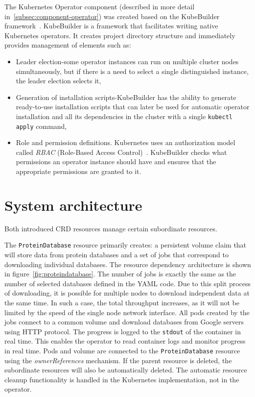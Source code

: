 The Kubernetes Operator component (described in more detail in~\ref{subsec:component-operator}) was created based on the KubeBuilder framework~\cite{kubebuilder}.
KubeBuilder is a framework that facilitates writing native Kubernetes operators.
It creates project directory structure and immediately provides management of elements such as:
\begin{itemize}
    \item Leader election-some operator instances can run on multiple cluster nodes simultaneously, but if there is a need to select a single distinguished instance, the leader election selects it,
    \item Generation of installation scripts-KubeBuilder has the ability to generate ready-to-use installation scripts that can later be used for automatic operator installation and all its dependencies in the cluster with a single \texttt{kubectl apply} command,
    \item Role and permission definitions.
    Kubernetes uses an authorization model called \textit{RBAC} (Role-Based Access Control)~\cite{k8s_rbac}.
    KubeBuilder checks what permissions an operator instance should have and ensures that the appropriate permissions are granted to it.
\end{itemize}


\section{System architecture}

Both introduced CRD resources manage certain subordinate resources.

The \texttt{ProteinDatabase} resource primarily creates: a persistent volume claim that will store data from protein databases and a set of jobs that correspond to downloading individual databases.
The resource dependency architecture is shown in figure~\ref{fig:proteindatabase}.
The number of jobs is exactly the same as the number of selected databases defined in the YAML code.
Due to this split process of downloading, it is possible for multiple nodes to download independent data at the same time.
In such a case, the total throughput increases, as it will not be limited by the speed of the single node network interface.
All pods created by the jobs connect to a common volume and download databases from Google servers using HTTP protocol.
The progress is logged to the \texttt{stdout} of the container in real time.
This enables the operator to read container logs and monitor progress in real time.
Pods and volume are connected to the \texttt{ProteinDatabase} resource using the \textit{ownerReferences} mechanism.
If the parent resource is deleted, the subordinate resources will also be automatically deleted.
The automatic resource cleanup functionality is handled in the Kubernetes implementation, not in the operator.

